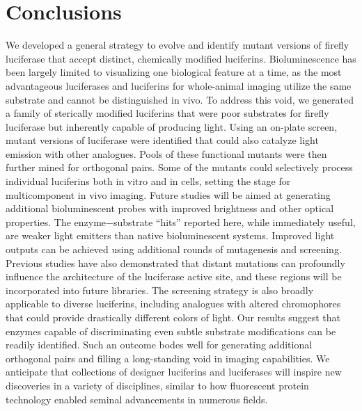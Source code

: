 \section{Conclusions}

We developed a general strategy to evolve and identify mutant
versions of firefly luciferase that accept distinct, chemically
modified luciferins. Bioluminescence has been largely limited to
visualizing one biological feature at a time, as the most
advantageous luciferases and luciferins for whole-animal
imaging utilize the same substrate and cannot be distinguished
in vivo. To address this void, we generated a family of sterically
modified luciferins that were poor substrates for firefly
luciferase but inherently capable of producing light. Using an
on-plate screen, mutant versions of luciferase were identified
that could also catalyze light emission with other analogues.
Pools of these functional mutants were then further mined for
orthogonal pairs. Some of the mutants could selectively process
individual luciferins both in vitro and in cells, setting the stage
for multicomponent in vivo imaging.
Future studies will be aimed at generating additional
bioluminescent probes with improved brightness and other
optical properties. The enzyme−substrate “hits” reported here,
while immediately useful, are weaker light emitters than native
bioluminescent systems. Improved light outputs can be
achieved using additional rounds of mutagenesis and screening.
Previous studies have also demonstrated that distant mutations
can profoundly influence the architecture of the luciferase active
site, and these regions will be incorporated into future libraries.
The screening strategy is also broadly applicable to diverse
luciferins, including analogues with altered chromophores that
could provide drastically different colors of light. Our results suggest that enzymes capable of discriminating even subtle
substrate modifications can be readily identified. Such an
outcome bodes well for generating additional orthogonal pairs
and filling a long-standing void in imaging capabilities. We
anticipate that collections of designer luciferins and luciferases
will inspire new discoveries in a variety of disciplines, similar to
how fluorescent protein technology enabled seminal advancements
in numerous fields.




